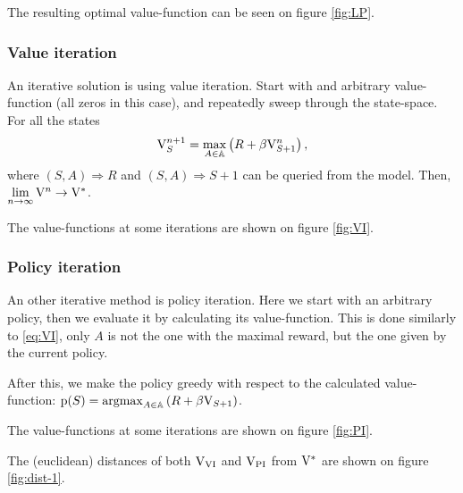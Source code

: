 The resulting optimal value-function can be seen on figure \ref{fig:LP}.

\subsubsection{Value iteration}

An iterative solution is using value iteration.
Start with and arbitrary value-function (all zeros in this case),
and repeatedly sweep through the state-space. For all the states
\begin{equation}\label{eq:VI}
	\mathrm{V}_S^{n+1} = \max\limits_{A\in\mathbb{A}}\left(R + \beta\mathrm{V}_{S+1}^n\right),
\end{equation}
where $(S,A)\Rightarrow R$ and $(S,A)\Rightarrow S+1$
can be queried from the model.
Then, $\lim\limits_{n\rightarrow\infty}\mathrm{V}^n\rightarrow\mathrm{V}^*$.

The value-functions at some iterations are shown on figure \ref{fig:VI}.

\subsubsection{Policy iteration}\label{sssec:PI}

An other iterative method is policy iteration.
Here we start with an arbitrary policy, then we evaluate it by calculating its value-function.
This is done similarly to \ref{eq:VI}, only $A$ is not the one with the maximal reward,
but the one given by the current policy.

After this, we make the policy greedy with respect to the calculated value-function:
$\mathrm{p}(S)=\operatorname{argmax}\limits_{A\in\mathbb{A}}\left(R + \beta\mathrm{V}_{S+1}\right)$.

The value-functions at some iterations are shown on figure \ref{fig:PI}.

The (euclidean) distances of both $\mathrm{V}_\text{VI}$ and $\mathrm{V}_\text{PI}$ from $\mathrm{V}^*$ are
shown on figure \ref{fig:dist-1}.

